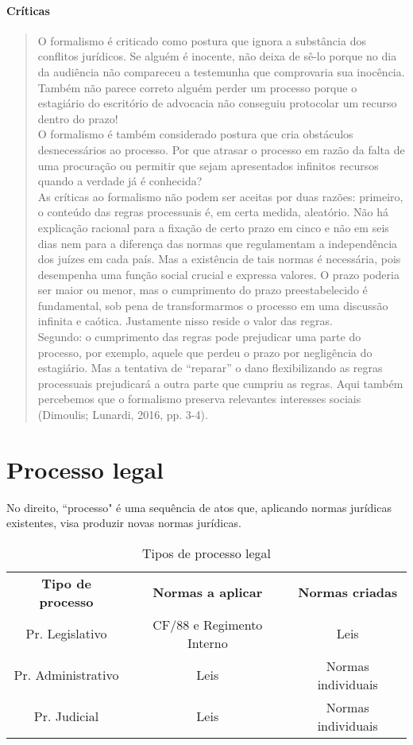 \documentclass{article}
\begin{document}
\paragraph{Críticas}

\begin{quote}
    O formalismo é criticado como postura que ignora a substância dos conflitos jurídicos. Se alguém é inocente, não deixa de sê-lo porque no dia da audiência não compareceu a testemunha que comprovaria sua inocência. Também não parece correto alguém perder um processo porque o estagiário do escritório de advocacia não conseguiu protocolar um recurso dentro do prazo!\\
    O formalismo é também considerado postura que cria obstáculos desnecessários ao processo. Por que atrasar o processo em razão da falta de uma procuração ou permitir que sejam apresentados infinitos recursos quando a verdade já é conhecida?\\
    As críticas ao formalismo não podem ser aceitas por duas razões: primeiro, o conteúdo das regras processuais é, em certa medida, aleatório. Não há explicação racional para a fixação de certo prazo em cinco e não em seis dias nem para a diferença das normas que regulamentam a independência dos juízes em cada país. Mas a existência de tais normas é necessária, pois desempenha uma função social crucial e expressa valores. O prazo poderia ser maior ou menor, mas o cumprimento do prazo preestabelecido é fundamental, sob pena de transformarmos o processo em uma discussão infinita e caótica. Justamente nisso reside o valor das regras.\\
    Segundo: o cumprimento das regras pode prejudicar uma parte do processo, por exemplo, aquele que perdeu o prazo por negligência do estagiário. Mas a tentativa de “reparar” o dano flexibilizando as regras processuais prejudicará a outra parte que cumpriu as regras. Aqui também percebemos que o formalismo preserva relevantes interesses sociais (Dimoulis; Lunardi, 2016, pp. 3-4).
\end{quote}

\section{Processo legal}

No direito, ``processo" é uma sequência de atos que, aplicando normas jurídicas existentes, visa produzir novas normas jurídicas.

\begin{table}[]
    \centering
    \begin{tabular}{ccc}
         \textbf{Tipo de processo} & \textbf{Normas a aplicar} & \textbf{Normas criadas} \\
        Pr. Legislativo & CF/88 e Regimento Interno & Leis\\
        Pr. Administrativo & Leis & Normas individuais\\
        Pr. Judicial & Leis & Normas individuais\\
    \end{tabular}
    \caption{Tipos de processo legal}
    \label{tab:tipos_de_processo_legal}
\end{table}
\end{document}

